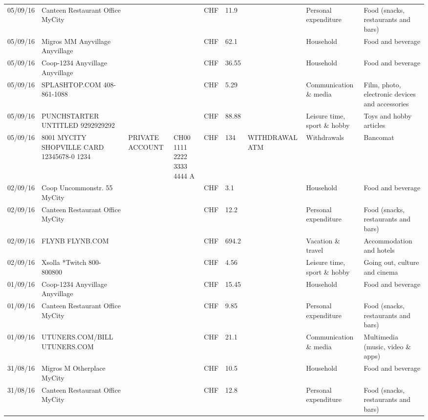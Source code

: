 \begin{landscape}
\begin{table}[t]
\begin{center}
\begin{tabular}{lllllllll}
		05/09/16 & Canteen Restaurant Office      MyCity &       &       & CHF   & 11.9  &       & Personal expenditure & Food (snacks, restaurants and bars) \\
		05/09/16 & Migros MM Anyvillage    Anyvillage &       &       & CHF   & 62.1  &       & Household & Food and beverage \\
		05/09/16 & Coop-1234 Anyvillage    Anyvillage &       &       & CHF   & 36.55 &       & Household & Food and beverage \\
		05/09/16 & SPLASHTOP.COM            408-861-1088 &       &       & CHF   & 5.29  &       & Communication \& media & Film, photo, electronic devices and accessories \\
		05/09/16 & PUNCHSTARTER UNTITLED     9292929292 &       &       & CHF   & 88.88 &       & Leisure time, sport \& hobby & Toys and hobby articles \\
		05/09/16 & 8001 MYCITY SHOPVILLE CARD 12345678-0 1234 & PRIVATE ACCOUNT & CH00 1111 2222 3333 4444 A & CHF   & 134   & WITHDRAWAL ATM & Withdrawals & Bancomat \\
		02/09/16 & Coop Uncommonstr. 55   MyCity &       &       & CHF   & 3.1   &       & Household & Food and beverage \\
		02/09/16 & Canteen Restaurant Office      MyCity &       &       & CHF   & 12.2  &       & Personal expenditure & Food (snacks, restaurants and bars) \\
		02/09/16 & FLYNB                   FLYNB.COM &       &       & CHF   & 694.2 &       & Vacation \& travel & Accommodation and hotels \\
		02/09/16 & Xsolla *Twitch           800-800800 &       &       & CHF   & 4.56  &       & Leisure time, sport \& hobby & Going out, culture and cinema \\
		01/09/16 & Coop-1234 Anyvillage    Anyvillage &       &       & CHF   & 15.45 &       & Household & Food and beverage \\
		01/09/16 & Canteen Restaurant Office      MyCity &       &       & CHF   & 9.85  &       & Personal expenditure & Food (snacks, restaurants and bars) \\
		01/09/16 & UTUNERS.COM/BILL          UTUNERS.COM &       &       & CHF   & 21.1  &       & Communication \& media & Multimedia (music, video \& apps) \\
		31/08/16 & Migros M Otherplace   MyCity &       &       & CHF   & 10.5  &       & Household & Food and beverage \\
		31/08/16 & Canteen Restaurant Office      MyCity &       &       & CHF   & 12.8  &       & Personal expenditure & Food (snacks, restaurants and bars) \\

\end{tabular}
\end{center}
\end{table}
\end{landscape}
